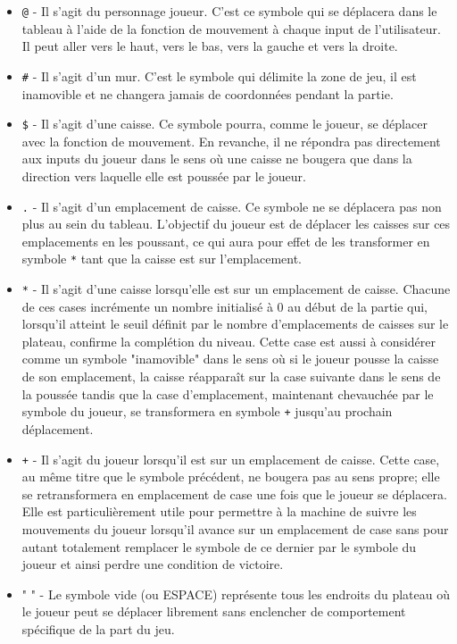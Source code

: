 \documentclass[a4paper,12pt]{article} %
\begin{document}
\begin{itemize}
\item \texttt{@} - Il s'agit du personnage joueur. C'est ce symbole qui se déplacera dans le tableau à l'aide de la fonction de mouvement à chaque input de l'utilisateur. Il peut aller vers le haut, vers le bas, vers la gauche et vers la droite.
\item \texttt{\#} - Il s'agit d'un mur. C'est le symbole qui délimite la zone de jeu, il est inamovible et ne changera jamais de coordonnées pendant la partie.
\item \texttt{\$} - Il s'agit d'une caisse. Ce symbole pourra, comme le joueur, se déplacer avec la fonction de mouvement. En revanche, il ne répondra pas directement aux inputs du joueur dans le sens où une caisse ne bougera que dans la direction vers laquelle elle est poussée par le joueur.
\item \texttt{.} - Il s'agit d'un emplacement de caisse. Ce symbole ne se déplacera pas non plus au sein du tableau. L'objectif du joueur est de déplacer les caisses sur ces emplacements en les poussant, ce qui aura pour effet de les transformer en symbole \texttt{*} tant que la caisse est sur l'emplacement.
\item \texttt{*} - Il s'agit d'une caisse lorsqu'elle est sur un emplacement de caisse. Chacune de ces cases incrémente un nombre initialisé à 0 au début de la partie qui, lorsqu'il atteint le seuil définit par le nombre d'emplacements de caisses sur le plateau, confirme la complétion du niveau. Cette case est aussi à considérer comme un symbole "inamovible" dans le sens où si le joueur pousse la caisse de son emplacement, la caisse réapparaît sur la case suivante dans le sens de la poussée tandis que la case d'emplacement, maintenant chevauchée par le symbole du joueur, se transformera en symbole \texttt{+} jusqu'au prochain déplacement.
\item \texttt{+} - Il s'agit du joueur lorsqu'il est sur un emplacement de caisse. Cette case, au même titre que le symbole précédent, ne bougera pas au sens propre; elle se retransformera en emplacement de case une fois que le joueur se déplacera. Elle est particulièrement utile pour permettre à la machine de suivre les mouvements du joueur lorsqu'il avance sur un emplacement de case sans pour autant totalement remplacer le symbole de ce dernier par le symbole du joueur et ainsi perdre une condition de victoire.
\item " " - Le symbole vide (ou ESPACE) représente tous les endroits du plateau où le joueur peut se déplacer librement sans enclencher de comportement spécifique de la part du jeu.  
\end{itemize}
\end{document}
